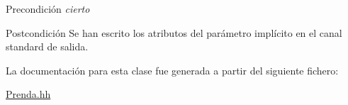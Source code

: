 \begin{DoxyPrecond}{Precondición}
{\itshape cierto} 
\end{DoxyPrecond}
\begin{DoxyPostcond}{Postcondición}
Se han escrito los atributos del parámetro implícito en el canal standard de salida. 
\end{DoxyPostcond}


La documentación para esta clase fue generada a partir del siguiente fichero\+:\begin{DoxyCompactItemize}
\item 
\hyperlink{_prenda_8hh}{Prenda.\+hh}\end{DoxyCompactItemize}
